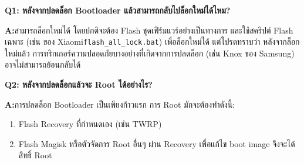 
\textbf{Q1: หลังจากปลดล็อก Bootloader แล้วสามารถกลับไปล็อกใหม่ได้ไหม?}\par

\textbf{A:}สามารถล็อกใหม่ได้ โดยปกติจะต้อง Flash ชุดเฟิร์มแวร์อย่างเป็นทางการ และใช้สคริปต์ Flash เฉพาะ (เช่น ของ Xiaomi\texttt{flash\_all\_lock.\allowbreak bat}) เพื่อล็อกใหม่ได้ แต่โปรดทราบว่า หลังจากล็อกใหม่แล้ว การทริกเกอร์ความปลอดภัยบางอย่างที่เกิดจากการปลดล็อก (เช่น Knox ของ Samsung) อาจไม่สามารถย้อนกลับได้

\textbf{Q2: หลังจากปลดล็อกแล้วจะ Root ได้อย่างไร?}\par

\textbf{A:}การปลดล็อก Bootloader เป็นเพียงก้าวแรก การ Root มักจะต้องทำดังนี้:

\begin{enumerate}
  \item Flash Recovery ที่กำหนดเอง (เช่น TWRP)
  \item Flash Magisk หรือตัวจัดการ Root อื่นๆ ผ่าน Recovery เพื่อแก้ไข boot image จึงจะได้สิทธิ์ Root
\end{enumerate}

